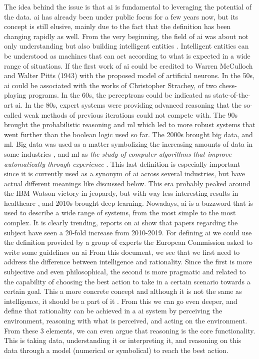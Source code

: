 The idea behind the issue is that \ac{ai} is fundamental to leveraging the potential of the data. \ac{ai} has already been under public focus for a few years now, but its concept is still elusive, mainly due to the fact that the definition has been changing rapidly as well.
From the very beginning, the field of \ac{ai} was about not only understanding but also building intelligent entities \cite{DBLP:books/aw/RN2020}.  Intelligent entities can be understood as machines that can act according to what is expected in a wide range of situations.
If the first work of \ac{ai} could be credited to Warren McCulloch and Walter Pitts (1943) with the proposed model of artificial neurons. In the 50s, \ac{ai} could be associated with the works of Christopher Strachey, of two chess-playing programs.
In the 60s, the perceptrons could be indicated as state-of-the-art \ac{ai}. In the 80s, expert systems were providing advanced reasoning that the so-called weak methods of previous iterations could not compete with.
The 90s brought the probabilistic reasoning and \ac{ml} which led to more robust systems that went further than the boolean logic used so far. The 2000s brought big data, and \ac{ml}. Big data was used as a matter symbolizing the increasing amounts of data in some industries \cite{dashBigDataHealthcare2019}, and \ac{ml} as \textit{ the study of computer algorithms that improve automatically through experience} \cite{mitchell1997machine}. This last definition is especially important since it is currently used as a synonym of \ac{ai} across several industries, but have actual different meanings like discussed below. This era probably peaked around the IBM Watson victory in jeopardy, but with way less interesting results in healthcare \cite{swetlitzIBMWatsonSupercomputer2018}, and 2010s brought deep learning. 
Nowadays, \ac{ai} is a buzzword that is used to describe a wide range of systems, from the most simple to the most complex. It is clearly trending, reports on \ac{ai} show that papers regarding the subject have seen a 20-fold increase from 2010-2019.
For defining \ac{ai} we could use the definition provided by a group of experts the European Commission asked to write some guidelines on \ac{ai} \cite{DefinitionAIMain2019}
From this document, we see that we first need to address the difference between intelligence and rationality. Since the first is more subjective and even philosophical, the second is more pragmatic and related to the capability of choosing the best action to take in a certain scenario towards a certain goal. This a more concrete concept and although it is not the same as intelligence, it should be a part of it \cite{DefinitionAIMain2019,DBLP:books/aw/RN2020}.
From this we can go even deeper, and define that rationality can be achieved in a \ac{ai} system by perceiving the environment, reasoning with what is perceived, and acting on the environment. From these 3 elements, we can even argue that reasoning is the core functionality. This is taking data, understanding it or interpreting it, and reasoning on this data through a model (numerical or symbolical) to reach the best action.

